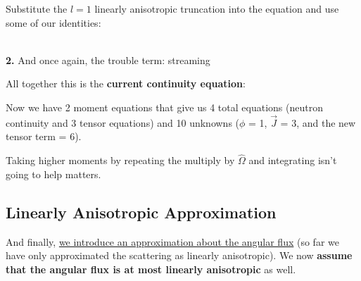 \documentclass[12pt]{article}
\newif\ifeqns
\newcommand{\vOmega}{\ensuremath{\hat{\Omega}}}
\begin{document}
Substitute the $l=1$ linearly anisotropic truncation into the equation and use some of our identities:
%
\ifeqns
\begin{align*}
\frac{1}{4\pi} \int_{4\pi}  &d\vOmega
\: \vOmega  \int_{4\pi} d\vOmega'\: \bigl[\Sigma_{s0} + 3\vOmega' \vOmega \Sigma_{s1} \bigr] \psi(\vec{r}, \vOmega', t) = \nonumber\\
%
& \underbrace{\frac{1}{4\pi} \int_{4\pi} d\vOmega \:\vOmega}_{0}  \underbrace{\int_{4\pi} d\vOmega'\:  \Sigma_{s0}\psi(\vec{r}, \vOmega', t)}_{\Sigma_{s0} \phi(\vec{r},t)} +
%
\frac{1}{4\pi} \underbrace{\int_{4\pi} d\vOmega \:\vOmega \vOmega}_{4\pi/3 \bar{\bar{I}}} \underbrace{\int_{4\pi} d\vOmega'\: \vOmega' 3  \Sigma_{s1}\psi(\vec{r}, \vOmega', t)}_{3\Sigma_{s1} \vec{J}(\vec{r},t)} \\
%
&= \boxed{\Sigma_{s1} \vec{J}(\vec{r},t)}
\end{align*}
\else
\vspace*{10em}\\
\fi
\textbf{2.} And once again, the trouble term: streaming
%
\ifeqns
\[\int_{4\pi} d\vOmega \:\vOmega \vOmega \cdot \nabla \psi(\vec{r}, \vOmega, t) = \nabla \cdot \int_{4\pi} d\vOmega \:\vOmega \vOmega \psi(\vec{r}, \vOmega, t) \]
\else
\vspace*{3em}
\fi

\vspace*{2em}
All together this is the \textbf{current continuity equation}:
\ifeqns
\begin{equation}
\frac{1}{v}\frac{\partial \vec{J}}{\partial t} 
+ \nabla \cdot \int_{4\pi} d\vOmega \:\vOmega \vOmega \psi(\vec{r}, \vOmega, t) +
\Sigma_t  \vec{J}(\vec{r}, t) =
\Sigma_{s1} \vec{J}(\vec{r},t)
+ S_{1}(\vec{r}, t) \:.
\label{eq:currentcont}
\end{equation}
\else
\vspace*{3em}
\fi

Now we have 2 moment equations that give us 4 total equations (neutron continuity and 3 tensor equations) and 10 unknowns ($\phi$ = 1, $\vec{J}$ = 3, and the new tensor term = 6). 

Taking higher moments by repeating the multiply by $\vOmega$ and integrating isn't going to help matters.


\subsection*{Linearly Anisotropic Approximation}
And finally, \underline{we introduce an approximation about the angular flux} (so far we have only approximated the scattering as linearly anisotropic). We now \textbf{assume that the angular flux is at most linearly anisotropic} as well.
\end{document}
